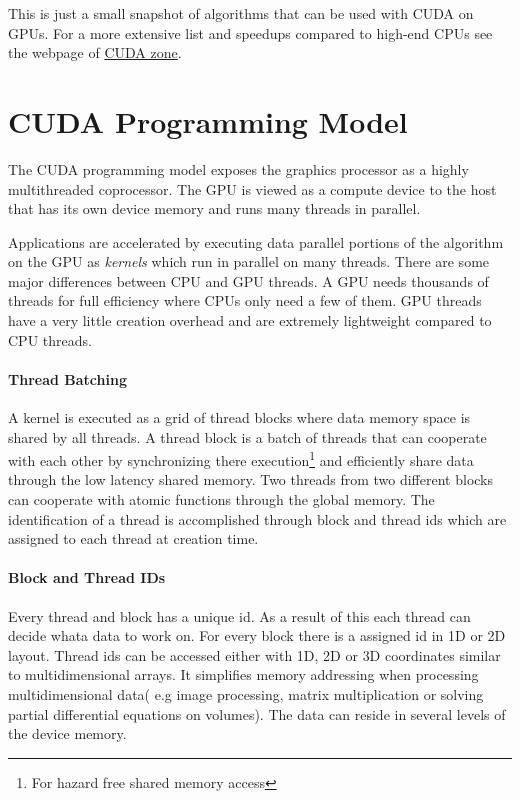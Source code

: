 This is just a small snapshot of algorithms that can be used with \gls{CUDA} on
\glspl{GPU}. For a more extensive list and speedups compared to high-end
\glspl{CPU} see the webpage of {}
\href{http://www.nvidia.com/cuda}{\gls{CUDA} zone}. 

\section{CUDA Programming Model}%
\label{sub:cuda_programming_model} 
The \gls{CUDA} programming model exposes the graphics processor as a highly
multithreaded coprocessor. The \gls{GPU} is viewed as a compute device to the
host that has its own device memory and runs many threads in parallel.

Applications are accelerated by executing data parallel portions of the
algorithm on the \gls{GPU} as \emph{kernels} which run in parallel on many
threads. There are some major differences between \gls{CPU} and
\gls{GPU} threads. A \gls{GPU} needs thousands of threads for full efficiency
where \glspl{CPU} only need a few of them. \Gls{GPU} threads have a very little
creation overhead and are extremely lightweight compared to \gls{CPU} threads.

\paragraph{Thread Batching}%
\label{par:thread_batching} 
A kernel is executed as a grid of thread blocks where data memory space is
shared by all threads. A thread block is a batch of threads that can cooperate
with each other by synchronizing there execution\footnote{For hazard free shared
memory access} and efficiently share data through the low latency shared
memory. Two threads from two different blocks can cooperate with atomic 
functions through the global memory. The identification of a thread is 
accomplished through block and thread ids which are assigned to each thread at 
creation time. 

\paragraph{Block and Thread IDs}%
\label{par:block_and_thread_ids} 
Every thread and block has a unique id. As a result of this each thread can
decide whata data to work on. For every block there is a assigned id in \gls{1D}
or \gls{2D} layout. Thread ids can be accessed either with \gls{1D}, \gls{2D} or
\gls{3D} coordinates similar to multidimensional arrays. It simplifies memory
addressing when processing multidimensional data( e.g image processing, matrix
multiplication or solving partial differential equations on volumes). The data
can reside in several levels of the device memory. %

